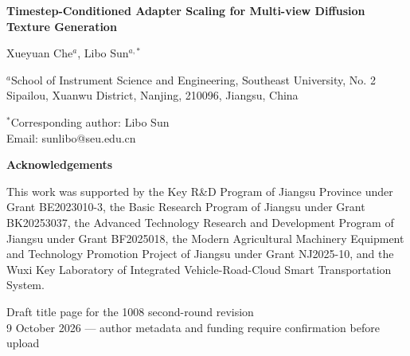 \documentclass[12pt]{article}
\begin{document}
\begin{center}
{\LARGE\bfseries Timestep-Conditioned Adapter Scaling for Multi-view Diffusion Texture Generation\par}
\vspace{1.2em}
Xueyuan Che$^{a}$, Libo Sun$^{a,*}$\par
\vspace{0.7em}
$^{a}$School of Instrument Science and Engineering, Southeast University, No. 2 Sipailou, Xuanwu District, Nanjing, 210096, Jiangsu, China\par
\vspace{0.6em}
$^{*}$Corresponding author: Libo Sun\\
Email: sunlibo@seu.edu.cn\par
\vspace{1.2em}
\textbf{Acknowledgements}\par
This work was supported by the Key R\&D Program of Jiangsu Province under Grant BE2023010-3, the Basic Research Program of Jiangsu under Grant BK20253037, the Advanced Technology Research and Development Program of Jiangsu under Grant BF2025018, the Modern Agricultural Machinery Equipment and Technology Promotion Project of Jiangsu under Grant NJ2025-10, and the Wuxi Key Laboratory of Integrated Vehicle-Road-Cloud Smart Transportation System.\par
\vspace{1.2em}
Draft title page for the 1008 second-round revision\\
9 October 2026 — author metadata and funding require confirmation before upload
\end{center}
\end{document}

